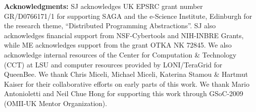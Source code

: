 \documentclass[3p,twocolumn]{elsarticle}
\begin{document}








\footnotesize{ {\noindent \bf Acknowledgments: }SJ acknowledges UK EPSRC grant
  number GR/D0766171/1 for supporting SAGA and the e-Science
  Institute, Edinburgh for the research theme, ``Distributed
  Programming Abstractions''.  SJ also acknowledges financial support
  from NSF-Cybertools and NIH-INBRE Grants, while ME acknowledges support
  from the grant OTKA NK 72845.  We also acknowledge
  internal resources of the Center for Computation \& Technology (CCT)
  at LSU and computer resources provided by LONI/TeraGrid for
  QueenBee.  We thank Chris Miceli, Michael Miceli, Katerina Stamou \&
  Hartmut Kaiser for their collaborative efforts on early parts of
  this work. We thank Mario Antonioletti and Neil Chue Hong for
  supporting this work through GSoC-2009 (OMII-UK Mentor
  Organization).}



\end{document}
